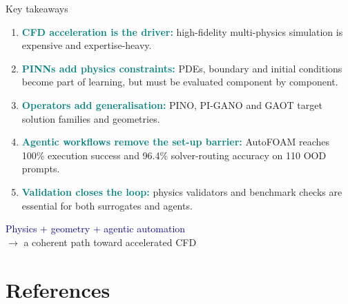 \documentclass[aspectratio=169,10pt]{beamer}
\newcommand{\key}[1]{\textcolor{teal}{\textbf{#1}}}
\begin{document}
\begin{frame}{Key takeaways}
\begin{enumerate}\setlength{\itemsep}{3pt}
  \item \key{CFD acceleration is the driver:} high-fidelity multi-physics simulation is expensive and expertise-heavy.
  \item \key{PINNs add physics constraints:} PDEs, boundary and initial conditions become part of learning, but must be evaluated component by component.
  \item \key{Operators add generalisation:} PINO, PI-GANO and GAOT target solution families and geometries.
  \item \key{Agentic workflows remove the set-up barrier:} AutoFOAM reaches 100\% execution success and 96.4\% solver-routing accuracy on 110 OOD prompts.
  \item \key{Validation closes the loop:} physics validators and benchmark checks are essential for both surrogates and agents.
\end{enumerate}
\vfill
\centering
\large\textcolor{navy}{Physics + geometry + agentic automation}\\
\large\textcolor{midgray}{$\longrightarrow$ a coherent path toward accelerated CFD}
\end{frame}

\section{References}
\end{document}
